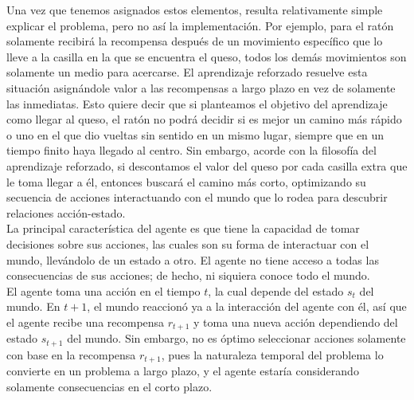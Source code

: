 Una vez que tenemos asignados estos elementos, resulta relativamente simple explicar el problema, pero no as\'i la implementaci\'on. Por ejemplo, para el rat\'on solamente recibir\'a la recompensa despu\'es de un movimiento espec\'ifico que lo lleve a la casilla en la que se encuentra el queso, todos los dem\'as movimientos son solamente un medio para acercarse. El aprendizaje reforzado resuelve esta situaci\'on asign\'andole valor a las recompensas a largo plazo en vez de solamente las inmediatas. Esto quiere decir que si planteamos el objetivo del aprendizaje como llegar al queso, el rat\'on no podr\'a decidir si es mejor un camino m\'as r\'apido o uno en el que dio vueltas sin sentido en un mismo lugar, siempre que en un tiempo finito haya llegado al centro. Sin embargo, acorde con la filosof\'ia del aprendizaje reforzado, si descontamos el valor del queso por cada casilla extra que le toma llegar a \'el, entonces buscar\'a el camino m\'as corto, optimizando su secuencia de acciones interactuando con el mundo que lo rodea para descubrir relaciones acci\'on-estado.\\

La principal caracter\'istica del agente es que tiene la capacidad de tomar decisiones sobre sus acciones, las cuales son su forma de interactuar con el mundo, llev\'andolo de un estado a otro. El agente no tiene acceso a todas las consecuencias de sus acciones; de hecho, ni siquiera conoce todo el mundo.\\

El agente toma una acci\'on en el tiempo $t$, la cual depende del estado $s_t$ del mundo. En $t+1$, el mundo reaccion\'o ya a la interacci\'on del agente con \'el, as\'i que el agente recibe una recompensa $r_{t+1}$ y toma una nueva acci\'on dependiendo del estado $s_{t+1}$ del mundo. Sin embargo, no es \'optimo seleccionar acciones solamente con base en la recompensa $r_{t+1}$, pues la naturaleza temporal del problema lo convierte en un problema a largo plazo, y el agente estar\'ia considerando solamente consecuencias en el corto plazo.\\

